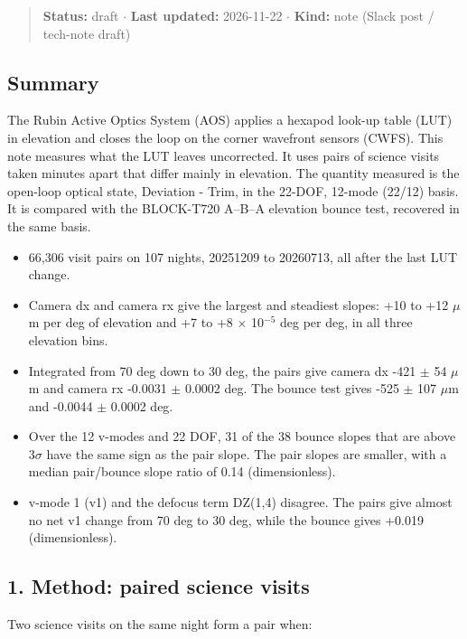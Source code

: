 \begin{quote}
\textbf{Status:} draft $\cdot$ \textbf{Last updated:} 2026-11-22 $\cdot$
\textbf{Kind:} note (Slack post / tech-note draft)
\end{quote}

\subsection{Summary}\label{summary}

The Rubin Active Optics System (AOS) applies a hexapod look-up table
(LUT) in elevation and closes the loop on the corner wavefront sensors
(CWFS). This note measures what the LUT leaves uncorrected. It uses
pairs of science visits taken minutes apart that differ mainly in
elevation. The quantity measured is the open-loop optical state,
Deviation - Trim, in the 22-DOF, 12-mode (22/12) basis. It is compared
with the BLOCK-T720 A--B--A elevation bounce test, recovered in the same
basis.

\begin{itemize}
\tightlist
\item
  66,306 visit pairs on 107 nights, 20251209 to 20260713, all after the
  last LUT change.
\item
  Camera dx and camera rx give the largest and steadiest slopes: +10 to
  +12 $\mu$m per deg of elevation and +7 to +8 $\times$ 10$^{-5}$ deg per deg, in all
  three elevation bins.
\item
  Integrated from 70 deg down to 30 deg, the pairs give camera dx -421 $\pm$
  54 $\mu$m and camera rx -0.0031 $\pm$ 0.0002 deg. The bounce test gives -525 $\pm$
  107 $\mu$m and -0.0044 $\pm$ 0.0002 deg.
\item
  Over the 12 v-modes and 22 DOF, 31 of the 38 bounce slopes that are
  above 3$\sigma$ have the same sign as the pair slope. The pair slopes are
  smaller, with a median pair/bounce slope ratio of 0.14
  (dimensionless).
\item
  v-mode 1 (v1) and the defocus term DZ(1,4) disagree. The pairs give
  almost no net v1 change from 70 deg to 30 deg, while the bounce gives
  +0.019 (dimensionless).
\end{itemize}

\subsection{1. Method: paired science
visits}\label{method-paired-science-visits}

Two science visits on the same night form a pair when:

